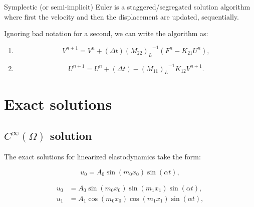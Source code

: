 \documentclass[12pt]{article}
\newcommand{\inverse}[1]{\ensuremath{{#1}^{-1}}} %
\begin{document}
Symplectic (or semi-implicit) Euler is a staggered/segregated
solution algorithm where first the velocity and then the
displacement are updated, sequentially.  

Ignoring bad notation for a second, we can write the algorithm as:
\begin{enumerate}
\item
\begin{equation}
V^{n+1} = V^{n} + (\Delta t) \inverse{(M_{22})_L} (F^n - K_{21}U^n),
\end{equation}
\item
\begin{equation}
U^{n+1} = U^n + (\Delta t) - \inverse{(M_{11})_L} K_{12} V^{n+1}.
\end{equation}
\end{enumerate}

\section{Exact solutions}


\subsection{$C^\infty(\Omega)$ solution}

The exact solutions for linearized elastodynamics take the form:

\begin{equation}
u_0 = A_0 \sin (m_0 x_0) \sin (\alpha t),
\end{equation}

\begin{subequations}
\begin{align}
u_0 &= A_0 \sin (m_0 x_0) \sin (m_1 x_1) \sin (\alpha t), \\
u_1 &= A_1 \cos (m_0 x_0) \cos (m_1 x_1) \sin (\alpha t), 
\end{align}
\end{subequations}
\end{document}
